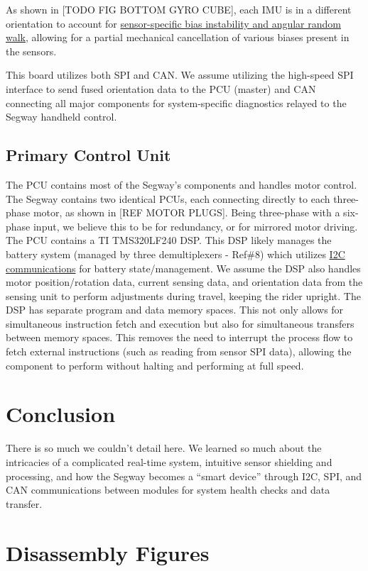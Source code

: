 \documentclass[]{formalLabReport}
\begin{document}
As shown in [TODO FIG BOTTOM GYRO CUBE], each IMU is in a different orientation to account for \href{https://base.xsens.com/hc/en-us/articles/209611089-Understanding-Sensor-Bias-offset-}{sensor-specific bias instability and angular random walk}, allowing for a partial mechanical cancellation of various biases present in the sensors. 

This board utilizes both SPI and CAN. We assume utilizing the high-speed SPI interface to send fused orientation data to the PCU (master) and CAN connecting all major components for system-specific diagnostics relayed to the Segway handheld control.

\subsection{Primary Control Unit}
The PCU contains most of the Segway’s components and handles motor control. The Segway contains two identical PCUs, each connecting directly to each three-phase motor, as shown in [REF MOTOR PLUGS]. Being three-phase with a six-phase input, we believe this to be for redundancy, or for mirrored motor driving. The PCU contains a TI TMS320LF240 DSP. This DSP likely manages the battery system (managed by three demultiplexers - Ref\#8) which utilizes \href{https://github.com/martinbogo/pt-battery-diagnostics}{I2C communications} for battery state/management. We assume the DSP also handles motor position/rotation data, current sensing data, and orientation data from the sensing unit to perform adjustments during travel, keeping the rider upright. The DSP has separate program and data memory spaces. This not only allows for simultaneous instruction fetch and execution but also for simultaneous transfers between memory spaces. This removes the need to interrupt the process flow to fetch external instructions (such as reading from sensor SPI data), allowing the component to perform without halting and performing at full speed.

\section{Conclusion}
There is so much we couldn’t detail here. We learned so much about the intricacies of a complicated real-time system, intuitive sensor shielding and processing, and how the Segway becomes a “smart device” through I2C, SPI, and CAN communications between modules for system health checks and data transfer.

\section{Disassembly Figures}
\end{document}
